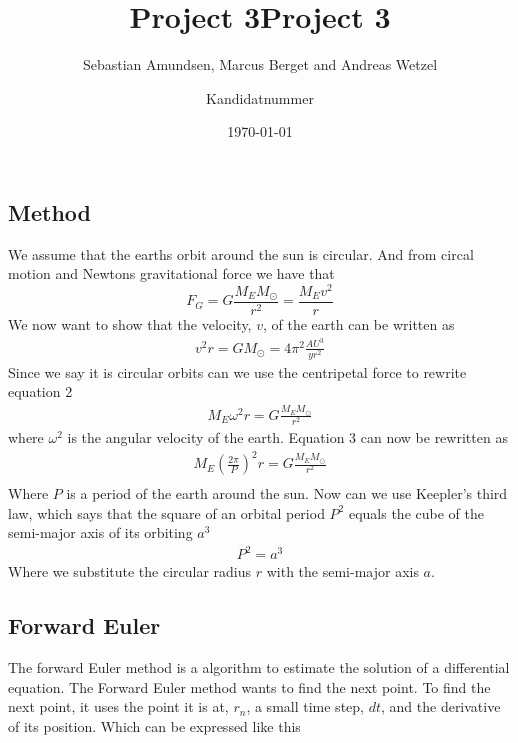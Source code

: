\documentclass{article}
\begin{document}
\title{Project 3}
\author{Sebastian Amundsen, Marcus Berget and Andreas Wetzel}



\title{Project 3}
\author{Kandidatnummer}

\date{\today}

\maketitle

\begin{abstract}

\end{abstract}

\begin{multicols}{2}

\section{Method}
We assume that the earths orbit around the sun is circular. And from circal motion and Newtons gravitational force we have that
\begin{equation}
    F_G=G\frac{M_EM_{\odot}}{r^2}=\frac{M_Ev^2}{r}
\end{equation}
We now want to show that the velocity, $v$, of the earth can be written as
\begin{align}
    v^2r=GM_{\odot}=4\pi^2\frac{AU^3}{yr^2}
\end{align}
Since we say it is circular orbits  can we use the centripetal force to rewrite equation 2 
\begin{align}
    M_E\omega^2r=G\frac{M_EM_{\odot}}{r^2}
\end{align}
where $\omega^2$ is the angular velocity of the earth. Equation 3 can now be rewritten as 
\begin{align}
    M_E(\frac{2\pi}{P})^2r=G\frac{M_EM_{\odot}}{r^2}\\
\end{align}
Where $P$ is a period of the earth around the sun.
Now can we use Keepler's third law, which says that the square of an orbital period $P^2$ equals the cube of the semi-major axis of its orbiting $a^3$
\begin{align}
    P^2=a^3
\end{align}
Where we substitute the circular radius $r$ with the semi-major axis $a$. 
\subsection{Forward Euler}
The forward Euler method is a algorithm to estimate the solution of a differential equation. The Forward Euler method wants to find the next point. To find the next point, it uses the point it is at, $r_n$, a small time step, $dt$, and the derivative of its position. Which can be expressed like this


\end{multicols}
\end{document}
